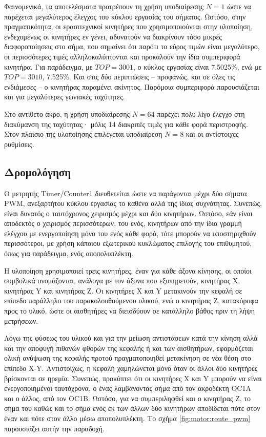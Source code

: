 Φαινομενικά, τα αποτελέσματα προτρέπουν τη χρήση υποδιαίρεσης $N = 1$ ώστε να
παρέχεται μεγαλύτερος έλεγχος του κύκλου εργασίας του σήματος. Ωστόσο, στην
πραγματικότητα, οι ερασιτεχνικοί κινητήρες που χρησιμοποιούνται στην υλοποίηση,
ενδεχομένως οι κινητήρες εν γένει, αδυνατούν να διακρίνουν τόσο μικρές
διαφοροποίησεις στο σήμα, που σημαίνει ότι παρότι το εύρος τιμών είναι
μεγαλύτερο, οι περισσότερες τιμές αλληλοκαλύπτονται και προκαλούν την ίδια
συμπεριφορά κινητήρα. Για παράδειγμα, με $TOP = 3001$, ο κύκλος εργασίας είναι
7.5025\%, ενώ με $TOP = 3010$, 7.525\%. Και στις δύο περιπτώσεις -- προφανώς,
και σε όλες τις ενδιάμεσες -- ο κινητήρας παραμένει ακίνητος. Παρόμοια
συμπεριφορά παρουσιάζεται και για μεγαλύτερες γωνιακές ταχύτητες.

Στο αντίθετο άκρο, η χρήση υποδιαίρεσης $N = 64$ παρέχει πολύ λίγο έλεγχο στη
διακύμανση της ταχύτητας· μόλις 14 διακριτές τιμές για κάθε φορά περιστροφής.
Στον πλαίσιο της υλοποίησης επιλέγεται υποδιαίρεση $N = 8$ και οι αντίστοιχες
ρυθμίσεις.


\subsection{Δρομολόγηση}

Ο μετρητής \textenglish{Timer\slash Counter1} διευθετείται ώστε να παράγονται
μέχρι δύο σήματα PWM, ανεξαρτήτου κύκλου εργασίας το καθένα αλλά της ίδιας
συχνότητας. Συνεπώς, είναι δυνατός ο ταυτόχρονος χειρισμός μέχρι και δύο
κινητήρων. Ωστόσο, εάν είναι αποδεκτός ο χειρισμός περισσότερων, του ενός,
κινητήρων από την ίδια γραμμή ελέγχου με ενεργοποίηση μόνο του ενός κάθε φορά,
τότε μπορούν να υποστηριχθούν περισσότεροι, με χρήση κάποιου εξωτερικού
κυκλώματος επιλογής του επιθυμητού, όπως για παράδειγμα, ενός αποπολυπλέκτη.

Η υλοποίηση χρησιμοποιεί τρεις κινητήρες, έναν για κάθε άξονα κίνησης, οι οποίοι
συμβολικά ονομάζονται, ανάλογα με τον άξονα που εξυπηρετούν, κινητήρας X,
κινητήρας Y και κινητήρας Z. Οι κινητήρες X και Y μετακινούν την κεφαλή σε
επίπεδο παράλληλο του παρακολουθούμενου υλικού, ενώ ο κινητήρας Z, κατακόρυφα
προς το υλικό, ώστε οι αισθητήρες να διεισδύουν σε κατάλληλο βάθος πριν τη λήψη
μετρήσεων.

Λόγω της φύσεως του υλικού και για την μείωση αντιστάσεων κατά την κίνηση αλλά
και την αποφυγή πιθανών φθορών της κεφαλής ή και των αισθητήρων, εφαρμόζεται
ολική ανύψωση της κεφαλής προτού πραγματοποιηθεί μετακίνηση σε νέα θέση στο
επίπεδο X-Y. Αντιστοίχως, η κεφαλή χαμηλώνεται μόνο όταν οι άλλοι δύο κινητήρες
βρίσκονται σε ηρεμία. Συνεπώς, προκύπτει ότι οι κινητήρες X και Y μπορούν να
είναι ενεργοποιημένοι ταυτόχρονα, ο ένας λαμβάνοντας σήμα από τον ακροδέκτη OC1A
και ο άλλος, από τον OC1B. Ωστόσο, για να συμπεριληφθεί και ο κινητήρας Z, το
σήμα του καθώς και το σήμα ενός εκ των άλλων δύο κινητήρων αποδίδεται πότε στον
έναν και πότε στον άλλο μέσω αποπολυπλέκτη. Το σχήμα
\ref{fig:motor:route_pwm} παρουσιάζει αυτήν την παραδοχή.

